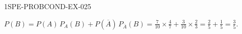 \begin{corrige}{1SPE-PROBCOND-EX-025}

$P(B) = P(A)\,P_A(B) + P(\overline{A})\,P_{\overline{A}}(B) = \frac{7}{10}\times\frac{4}{7} + \frac{3}{10}\times\frac{2}{3} = \frac{2}{5}+\frac{1}{5} = \frac{3}{5}$.

\end{corrige}
